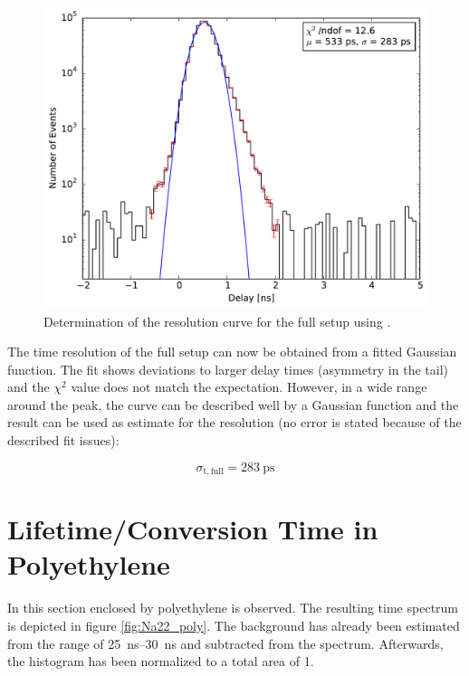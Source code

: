 \documentclass[
	paper=A4,
	parskip=full,
	chapterprefix=true,
	11pt,
	headings=normal,
	bibliography=totoc,
	listof=totoc,
	titlepage=on,
]{scrreprt}
\begin{document}
\begin{figure}
	\centering
	\includegraphics{resolution_peak}
	\caption{Determination of the resolution curve for the full setup using .}
	\label{fig:resolution_peak}
\end{figure}

The time resolution of the full setup can now be obtained from a fitted Gaussian function. The fit shows deviations to larger delay times (asymmetry in the tail) and the $\chi^2$ value does not match the expectation. However, in a wide range around the peak, the curve can be described well by a Gaussian function and the result can be used as estimate for the resolution (no error is stated because of the described fit issues):

\begin{equation}
	\sigma_\mathrm{t,full}=\SI{283}{\pico\second}
\end{equation}

\newpage

\section{Lifetime/Conversion Time in Polyethylene}
In this section  enclosed by polyethylene is observed. The resulting time spectrum is depicted in figure \ref{fig:Na22_poly}. The background has already been estimated from the range of \SIrange{25}{30}{\nano\second} and subtracted from the spectrum. Afterwards, the histogram has been normalized to a total area of \num{1}.
\end{document}
